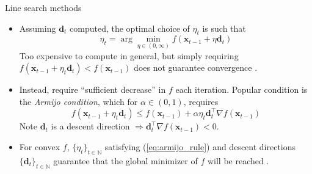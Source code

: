 \documentclass{beamer}
\numberwithin{equation}{section}
\newcommand{\aref}[1]{\alert{\ref{#1}}}
\begin{document}
\begin{frame}{Line search methods}
    \begin{itemize}
        \item
        Assuming $ \mathbf{d}_t $ computed, the optimal choice of $ \eta_t $
        is such that
        \begin{equation} \label{eq:exact_line_search}
            \eta_t = \arg\min_{\eta \in (0, \infty)}
            f(\mathbf{x}_{t - 1} + \eta\mathbf{d}_t)
        \end{equation}
        Too expensive to compute in general, but simply requiring $ f(\mathbf{x}_{t - 1} + \eta_t\mathbf{d}_t) < f(\mathbf{x}_{t - 1}) $ does not guarantee convergence \cite{nocedal_opt}.

        \item
        Instead, require ``sufficient decrease'' in $ f $ each iteration.
        Popular condition is the \textit{Armijo condition}, which for
        $ \alpha \in (0, 1) $, requires
        \begin{equation} \label{eq:armijo_rule}
            f(\mathbf{x}_{t - 1} + \eta_t\mathbf{d}_t) \le
            f(\mathbf{x}_{t - 1}) + \alpha\eta_t\mathbf{d}_t^\top\nabla f(\mathbf{x}_{t - 1})
        \end{equation}
        Note $ \mathbf{d}_t $ is a descent direction $ \Rightarrow \mathbf{d}_t^\top\nabla f(\mathbf{x}_{t - 1}) < 0 $.

        \item
        For convex $ f $, $ \{\eta_t\}_{t \in \mathbb{N}} $ satisfying (\aref{eq:armijo_rule}) and descent directions $ \{\mathbf{d}_t\}_{t \in \mathbb{N}} $ guarantee that the global minimizer of $ f $ will be reached \cite{stat_learn_sparsity}.
    \end{itemize}
\end{frame}
\end{document}

